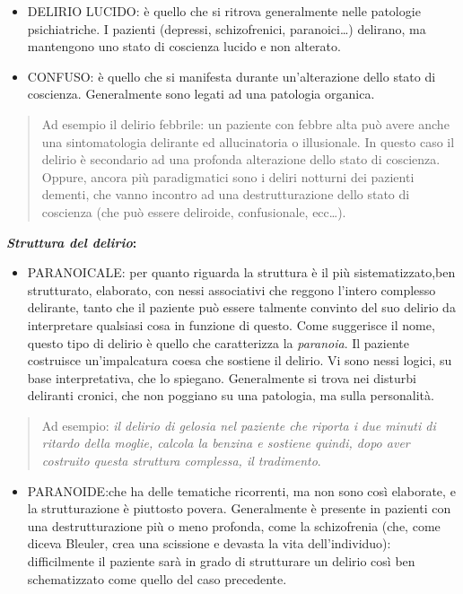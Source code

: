 \documentclass[]{article}
\begin{document}
\begin{itemize}
\item
  DELIRIO LUCIDO: è quello che si ritrova generalmente nelle patologie
  psichiatriche. I pazienti (depressi, schizofrenici, paranoici\ldots{})
  delirano, ma mantengono uno stato di coscienza lucido e non alterato.
\item
  CONFUSO: è quello che si manifesta durante un'alterazione dello stato
  di coscienza. Generalmente sono legati ad una patologia organica.
\end{itemize}

\begin{quote}
Ad esempio il delirio febbrile: un paziente con febbre alta può avere
anche una sintomatologia delirante ed allucinatoria o illusionale. In
questo caso il delirio è secondario ad una profonda alterazione dello
stato di coscienza. Oppure, ancora più paradigmatici sono i deliri
notturni dei pazienti dementi, che vanno incontro ad una
destrutturazione dello stato di coscienza (che può essere deliroide,
confusionale, ecc\ldots{}).
\end{quote}

\textbf{\emph{Struttura del delirio}: }

\begin{itemize}
\item
  PARANOICALE: per quanto riguarda la struttura è il più
  sistematizzato,ben strutturato, elaborato, con nessi associativi che
  reggono l'intero complesso delirante, tanto che il paziente può essere
  talmente convinto del suo delirio da interpretare qualsiasi cosa in
  funzione di questo. Come suggerisce il nome, questo tipo di delirio è
  quello che caratterizza la \emph{paranoia}. Il paziente costruisce
  un'impalcatura coesa che sostiene il delirio. Vi sono nessi logici, su
  base interpretativa, che lo spiegano. Generalmente si trova nei
  disturbi deliranti cronici, che non poggiano su una patologia, ma
  sulla personalità.
\end{itemize}

\begin{quote}
Ad esempio: \emph{il delirio di gelosia nel paziente che riporta i due
minuti di ritardo della moglie, calcola la benzina e sostiene quindi,
dopo aver costruito questa struttura complessa, il tradimento}.
\end{quote}

\begin{itemize}
\item
  PARANOIDE:che ha delle tematiche ricorrenti, ma non sono così
  elaborate, e la strutturazione è piuttosto povera. Generalmente è
  presente in pazienti con una destrutturazione più o meno profonda,
  come la schizofrenia (che, come diceva Bleuler, crea una scissione e
  devasta la vita dell'individuo): difficilmente il paziente sarà in
  grado di strutturare un delirio così ben schematizzato come quello del
  caso precedente.
\end{itemize}
\end{document}

